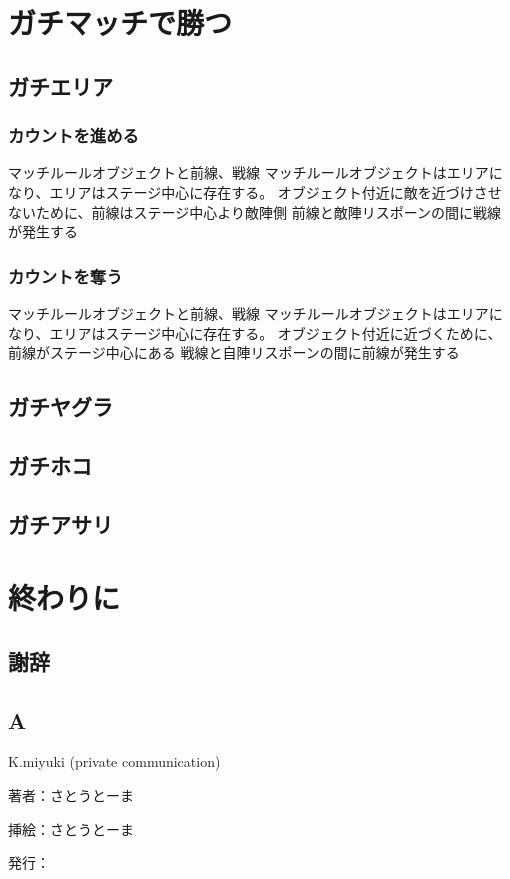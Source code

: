 \documentclass[a4paper,11pt]{jsbook}
\begin{document}
\part{ガチマッチで勝つ}
\chapter{ガチエリア}
\section{カウントを進める}
マッチルールオブジェクトと前線、戦線
マッチルールオブジェクトはエリアになり、エリアはステージ中心に存在する。
オブジェクト付近に敵を近づけさせないために、前線はステージ中心より敵陣側
前線と敵陣リスポーンの間に戦線が発生する

\section{カウントを奪う}
マッチルールオブジェクトと前線、戦線
マッチルールオブジェクトはエリアになり、エリアはステージ中心に存在する。
オブジェクト付近に近づくために、前線がステージ中心にある
戦線と自陣リスポーンの間に前線が発生する


\chapter{ガチヤグラ}
\chapter{ガチホコ}
\chapter{ガチアサリ}

\part{終わりに}
\chapter{謝辞}

\appendix
\chapter{A}



\begin{thebibliography}{2}

K.miyuki (private communication)
\end{thebibliography}

\thispagestyle{empty}
\begin{flushright}
\begin{minipage}{0.5\hsize}
\begin{description}
  \item{著者：}さとうとーま
  \item{挿絵：}さとうとーま
  \item{発行：}\date{\today}
\end{description}
\end{minipage}
\end{flushright}
\end{document}
